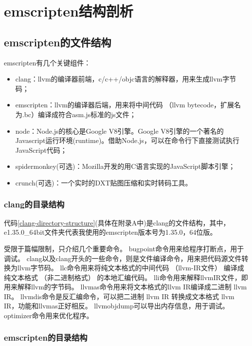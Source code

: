\chapter{emscripten结构剖析}

\section{emscripten的文件结构}

emscripten有几个关键组件：

\begin{itemize}
    \item {\heiti clang：}llvm的编译器前端，c/c++/objc语言的解释器，用来生成llvm字节码；
    \item {\heiti emscripten：}llvm的编译器后端，用来将中间代码 （llvm bytecode，扩展名为.bc）编译成符合asm.js标准的js文件；
    \item {\heiti node：}Node.js的核心是Google V8引擎。Google V8引擎的一个著名的Javascript运行环境(runtime)。借助Node.js，可以在命令行下直接测试执行JavaScript代码；
    \item {\heiti spidermonkey(可选)：}Mozilla开发的用C语言实现的JavaScript脚本引擎；
    \item {\heiti crunch(可选)：}一个实时的DXT贴图压缩和实时转码工具。
\end{itemize}

\subsection{clang的目录结构}

代码\ref{clang-directory-structure}(具体在附录A中)是clang的文件结构，其中，e1.35.0\_64bit文件夹代表我使用的emscripten版本号为1.35.0，64位版。

受限于篇幅限制，只介绍几个重要命令。
bugpoint命令用来给程序打断点，用于调试。
clang以及clang开头的一些命令，则是文件编译命令，用来把代码源文件转换为llvm字节码。
llc命令用来将纯文本格式的中间代码 （llvm-IR文件） 编译成纯文本格式 （非二进制格式） 的本地汇编代码。
lli命令用来解释llvm\text{-}IR文件，即用来解释llvm的字节码。
llvm\text{-}as命令用来将文本格式的llvm IR编译成二进制 llvm IR。
llvm\text{-}dis命令是反汇编命令，可以把二进制 llvm IR 转换成文本格式 llvm IR，功能和llvm\text{-}as正好相反。
llvm\text{-}objdump可以导出内存信息，用于调试。
optimizer命令用来优化程序。

\subsection{emscripten的目录结构}

